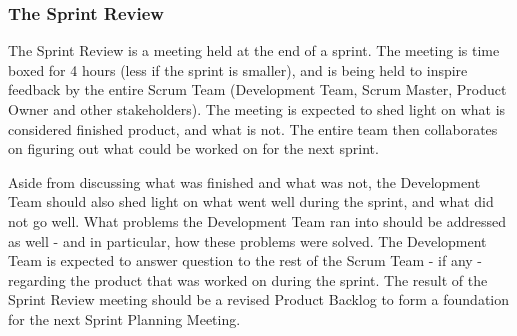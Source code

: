\subsubsection{The Sprint Review}


The Sprint Review is a meeting held at the end of a sprint. The meeting is time boxed for 4 hours (less if the sprint is smaller), and is being held to inspire feedback by the entire Scrum Team (Development Team, Scrum Master, Product Owner and other stakeholders)\cite{scrumguide11}. The meeting is expected to shed light on what is considered finished product, and what is not\cite{scrumguide11}. The entire team then collaborates on figuring out what could be worked on for the next sprint\cite{scrumguide11}. 


Aside from discussing what was finished and what was not, the Development Team should also shed light on what went well during the sprint, and what did not go well\cite{scrumguide11}. What problems the Development Team ran into should be addressed as well - and in particular, how these problems were solved\cite{scrumguide11}. The Development Team is expected to answer question to the rest of the Scrum Team - if any - regarding the product that was worked on during the sprint\cite{scrumguide11}. The result of the Sprint Review meeting should be a revised Product Backlog to form a foundation for the next Sprint Planning Meeting\cite{scrumguide11}.